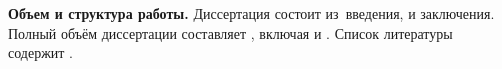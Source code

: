 \newcommand{\contribution}{\section*{\contributionTXT}}
\newcommand{\publications}{\section*{\publicationsTXT}}


\textbf{Объем и структура работы.} Диссертация состоит из~введения,
и заключения.%
%
Полный объём диссертации составляет
, включая
 и
.
Список литературы содержит
.


{\contents}
{\gratitude}

